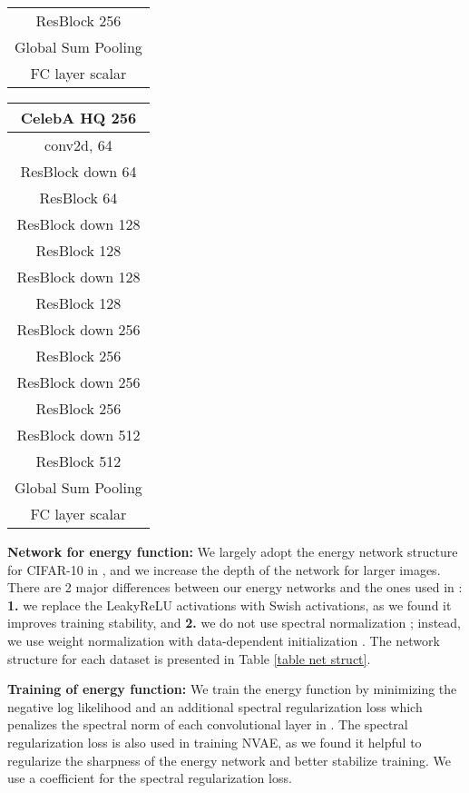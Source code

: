 \documentclass{article} \usepackage{iclr2021_conference,times}
\begin{document}
\begin{table}[ht]
\begin{tabular}{c}
     ResBlock 256\\
     Global Sum Pooling\\
     FC layer  scalar\\
     \hline
     \end{tabular}
         \quad
     \begin{tabular}{c}
     CelebA HQ 256\\
     \hline
      conv2d, 64\\
     ResBlock down 64\\
     ResBlock 64\\
     ResBlock down 128\\
     ResBlock 128\\
     ResBlock down 128\\
     ResBlock 128\\
     ResBlock down 256\\
     ResBlock 256\\
     ResBlock down 256\\
     ResBlock 256\\
     ResBlock down 512\\
     ResBlock 512\\
     Global Sum Pooling\\
     FC layer  scalar\\
     \hline
     \end{tabular}
    
 \end{table}
 \textbf{Network for energy function: }We largely adopt the energy network structure for CIFAR-10 in \citet{du2019implicit}, and we increase the depth of the network for larger images. There are 2 major differences between our energy networks and the ones used in \citet{du2019implicit}: \textbf{1.} we replace the LeakyReLU activations with Swish activations, as we found it improves training stability, and \textbf{2.} we do not use spectral normalization \citep{miyato2018spectral}; instead, we use weight normalization with data-dependent initialization \citep{salimans2016weight}. The network structure for each dataset is presented in Table \ref{table net struct}. 
 
 \textbf{Training of energy function: }We train the energy function by minimizing the negative log likelihood and an additional spectral regularization loss which penalizes the spectral norm of each convolutional layer in . The spectral regularization loss is also used in training NVAE, as we found it helpful to regularize the sharpness of the energy network and better stabilize training. We use a coefficient  for the spectral regularization loss. 
 
\end{document}
